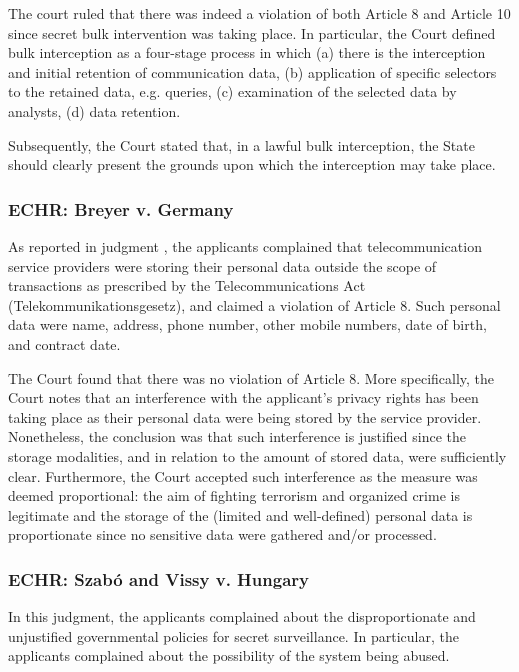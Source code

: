 The court ruled that there was indeed a violation of both Article 8 and Article 10 since secret bulk intervention was taking place. In particular, the Court defined bulk interception as a four-stage process in which (a) there is the interception and initial retention of communication data, (b) application of specific selectors to the retained data, e.g. queries, (c) examination of the selected data by analysts, (d) data retention. 

Subsequently, the Court stated that, in a lawful bulk interception, the State should clearly present the grounds upon which the interception may take place.

\subsubsection{ECHR: Breyer v. Germany}

As reported in judgment \cite{telecom}, the applicants complained that telecommunication service providers were storing their personal data outside the scope of transactions as prescribed by the Telecommunications Act (Telekommunikationsgesetz), and claimed a violation of Article 8. Such personal data were name, address, phone number, other mobile numbers, date of birth, and contract date.

The Court found that there was no violation of Article 8. More specifically, the Court notes that an interference with the applicant's privacy rights has been taking place as their personal data were being stored by the service provider. Nonetheless, the conclusion was that such interference is justified since the storage modalities, and in relation to the amount of stored data, were sufficiently clear. Furthermore, the Court accepted such interference as the measure was deemed proportional: the aim of fighting terrorism and organized crime is legitimate and the storage of the (limited and well-defined) personal data is proportionate since no sensitive data were gathered and/or processed.

\subsubsection{ECHR: Szabó and Vissy v. Hungary}

In this judgment, the applicants complained about the disproportionate and unjustified governmental policies for secret surveillance\cite{Hungary}. In particular, the applicants complained about the possibility of the system being abused. 

